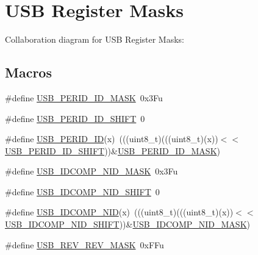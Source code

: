 \hypertarget{group___u_s_b___register___masks}{}\section{U\+SB Register Masks}
\label{group___u_s_b___register___masks}
Collaboration diagram for U\+SB Register Masks\+:
\subsection*{Macros}
\begin{DoxyCompactItemize}
\item 
\#define \hyperlink{group___u_s_b___register___masks_ga7c4ef4c7ba738b9ec7ee90c6c482c1e5}{U\+S\+B\+\_\+\+P\+E\+R\+I\+D\+\_\+\+I\+D\+\_\+\+M\+A\+SK}~0x3\+Fu
\item 
\#define \hyperlink{group___u_s_b___register___masks_ga15b2af97cadcb108b2489e2d29e8957e}{U\+S\+B\+\_\+\+P\+E\+R\+I\+D\+\_\+\+I\+D\+\_\+\+S\+H\+I\+FT}~0
\item 
\#define \hyperlink{group___u_s_b___register___masks_gad306299b648ed1827f0b4a6ad1c81c1d}{U\+S\+B\+\_\+\+P\+E\+R\+I\+D\+\_\+\+ID}(x)~(((uint8\+\_\+t)(((uint8\+\_\+t)(x))$<$$<$\hyperlink{group___u_s_b___register___masks_ga15b2af97cadcb108b2489e2d29e8957e}{U\+S\+B\+\_\+\+P\+E\+R\+I\+D\+\_\+\+I\+D\+\_\+\+S\+H\+I\+FT}))\&\hyperlink{group___u_s_b___register___masks_ga7c4ef4c7ba738b9ec7ee90c6c482c1e5}{U\+S\+B\+\_\+\+P\+E\+R\+I\+D\+\_\+\+I\+D\+\_\+\+M\+A\+SK})
\item 
\#define \hyperlink{group___u_s_b___register___masks_ga91e5cef0c6203ea503c01ecb0f392819}{U\+S\+B\+\_\+\+I\+D\+C\+O\+M\+P\+\_\+\+N\+I\+D\+\_\+\+M\+A\+SK}~0x3\+Fu
\item 
\#define \hyperlink{group___u_s_b___register___masks_gabb5fe5f72dcf289ba2d624ed18f8f07a}{U\+S\+B\+\_\+\+I\+D\+C\+O\+M\+P\+\_\+\+N\+I\+D\+\_\+\+S\+H\+I\+FT}~0
\item 
\#define \hyperlink{group___u_s_b___register___masks_ga00f75febd050c5d7be60f755cc502eae}{U\+S\+B\+\_\+\+I\+D\+C\+O\+M\+P\+\_\+\+N\+ID}(x)~(((uint8\+\_\+t)(((uint8\+\_\+t)(x))$<$$<$\hyperlink{group___u_s_b___register___masks_gabb5fe5f72dcf289ba2d624ed18f8f07a}{U\+S\+B\+\_\+\+I\+D\+C\+O\+M\+P\+\_\+\+N\+I\+D\+\_\+\+S\+H\+I\+FT}))\&\hyperlink{group___u_s_b___register___masks_ga91e5cef0c6203ea503c01ecb0f392819}{U\+S\+B\+\_\+\+I\+D\+C\+O\+M\+P\+\_\+\+N\+I\+D\+\_\+\+M\+A\+SK})
\item 
\#define \hyperlink{group___u_s_b___register___masks_ga72a356a066674e41e3827b0ccb931e71}{U\+S\+B\+\_\+\+R\+E\+V\+\_\+\+R\+E\+V\+\_\+\+M\+A\+SK}~0x\+F\+Fu

\end{DoxyCompactItemize}
